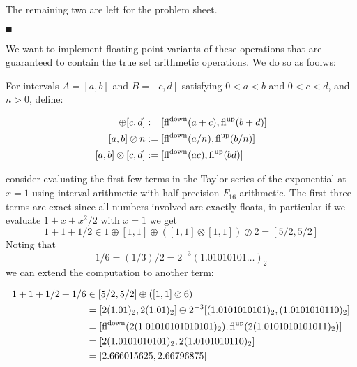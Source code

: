 The remaining two are left for the problem sheet. 

\ensuremath{\QED}

We want to  implement floating point variants of these operations that are guaranteed to contain the true set arithmetic operations. We do so as foolws:

\begin{definition} For intervals  $A = [a,b]$ and $B = [c,d]$ satisfying $0 < a < b$ and $0 < c < d$, and $n > 0$, define:


\begin{align*}
[a,b] \ensuremath{\oplus} [c,d] &:= [{\rm fl}^{\rm down}(a+c), {\rm fl}^{\rm up}(b+d)] \\
[a,b] \ensuremath{\oslash} n &:= [{\rm fl}^{\rm down}(a/n), {\rm fl}^{\rm up}(b/n)] \\
[a,b] \ensuremath{\otimes} [c,d] &:= [{\rm fl}^{\rm down}(ac), {\rm fl}^{\rm up}(bd)]
\end{align*}
\end{definition}

\begin{example} consider evaluating the first few terms in the Taylor series of the exponential at $x = 1$ using interval arithmetic with half-precision $F_{16}$ arithmetic.  The first three terms are exact since all numbers involved are exactly floats, in particular if we evaluate $1 + x + x^2/2$ with $x = 1$ we get
\[
1 + 1 + 1/2 \ensuremath{\in} 1 \ensuremath{\oplus} [1,1] \ensuremath{\oplus} ([1,1] \ensuremath{\otimes} [1,1]) \ensuremath{\oslash} 2 = [5/2, 5/2]
\]
Noting that 
\[
1/6 = (1/3)/2 = 2^{-3} (1.01010101\ensuremath{\ldots})_2
\]
we can extend the computation to another term:


\begin{align*}
1 + 1 + 1/2 + 1/6 &\ensuremath{\in} [5/2,5/2] \ensuremath{\oplus} ([1,1] \ensuremath{\oslash} 6) \ccr
= [2 (1.01)_2, 2 (1.01)_2] \ensuremath{\oplus} 2^{-3}[(1.0101010101)_2, (1.0101010110)_2] \ccr
= [{\rm fl}^{\rm down}(2 (1.01010101010101)_2), {\rm fl}^{\rm up}(2 (1.0101010101011)_2)] \ccr
= [2(1.0101010101)_2, 2(1.0101010110)_2] \ccr 
= [2.666015625, 2.66796875]
\end{align*}
\end{example}

